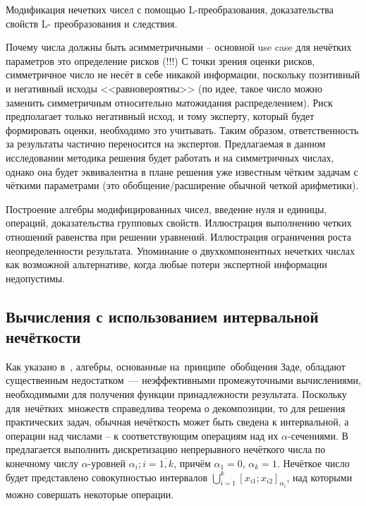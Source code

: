 
Модификация нечетких чисел с помощью L-преобразования, доказательства свойств L- преобразования и следствия.

Почему числа должны быть асимметричными – основной use case для нечётких параметров это определение рисков (!!!) С точки зрения оценки рисков, симметричное число не несёт в себе никакой информации, поскольку позитивный и негативный исходы <<равновероятны>> (по идее, такое число можно заменить симметричным относительно матожидания распределением). Риск предполагает только негативный исход, и тому эксперту, который будет формировать оценки, необходимо это учитывать. Таким образом, ответственность за результаты частично переносится на экспертов. Предлагаемая в данном исследовании методика решения будет работать и на симметричных числах, однако она будет эквивалентна в плане решения уже известным чётким задачам с чёткими параметрами (это обобщение/расширение обычной четкой арифметики).

Построение алгебры модифицированных чисел, введение нуля и единицы,  операций, доказательства групповых свойств. Иллюстрация выполнению четких отношений равенства при решении уравнений. Иллюстрация ограничения роста неопределенности результата. Упоминание о двухкомпонентных нечетких числах как возможной альтернативе, когда любые потери экспертной информации недопустимы.

\subsection{Вычисления с использованием интервальной нечёткости}
Как указано в~\cite{Rotshtein, Borisov_Krumberg_Riga, Evdokimov}, алгебры, основанные на~принципе~обобщения Заде, обладают существенным недостатком~--- неэффективными промежуточными вычислениями, необходимыми для получения функции принадлежности результата. Поскольку для~нечётких~множеств справедлива теорема о декомпозиции, то для решения практических задач, обычная нечёткость может быть сведена к интервальной, а операции над числами – к соответствующим операциям над их $\alpha$-сечениями. В~\cite{Borisov_Krumberg_Riga} предлагается выполнить дискретизацию непрерывного нечёткого числа по конечному числу $\alpha$-уровней $\alpha_i;i=\overline{1,k}$, причём $\alpha_1=0$, $\alpha_k=1$. Нечёткое число будет представлено совокупностью интервалов $\displaystyle \bigcup\limits_{i=1}^{k}{{{\left[ x_{i1}; x_{i2} \right]}_{\alpha_i}}}$, над которыми можно совершать некоторые операции.

